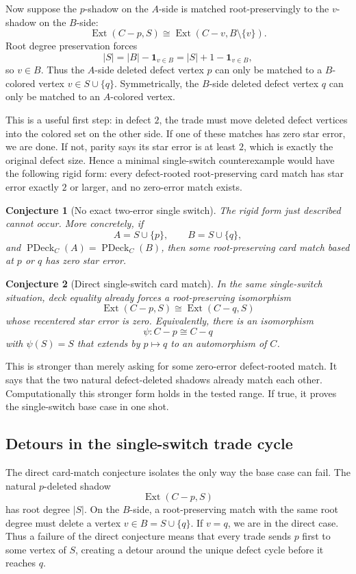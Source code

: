 \documentclass[11pt]{article}
\newtheorem{conjecture}{Conjecture}
\newcommand{\PDeck}{\operatorname{PDeck}}
\newcommand{\Ext}{\operatorname{Ext}}
\newcommand{\one}{\mathbf{1}}
\begin{document}
Now suppose the \(p\)-shadow on the \(A\)-side is matched root-preservingly to
the \(v\)-shadow on the \(B\)-side:
\[
  \Ext(C-p,S)
  \cong
  \Ext(C-v,B\setminus\{v\}).
\]
Root degree preservation forces
\[
  |S|=|B|-\one_{v\in B}=|S|+1-\one_{v\in B},
\]
so \(v\in B\).  Thus the \(A\)-side deleted defect vertex \(p\) can only be
matched to a \(B\)-colored vertex \(v\in S\cup\{q\}\).  Symmetrically, the
\(B\)-side deleted defect vertex \(q\) can only be matched to an
\(A\)-colored vertex.

This is a useful first step: in defect \(2\), the trade must move deleted
defect vertices into the colored set on the other side.  If one of these
matches has zero star error, we are done.  If not, parity says its star error
is at least \(2\), which is exactly the original defect size.  Hence a
minimal single-switch counterexample would have the following rigid form:
every defect-rooted root-preserving card match has star error exactly \(2\) or
larger, and no zero-error match exists.

\begin{conjecture}[No exact two-error single switch]
The rigid form just described cannot occur.  More concretely, if
\[
  A=S\cup\{p\},
  \qquad
  B=S\cup\{q\},
\]
and \(\PDeck_C(A)=\PDeck_C(B)\), then some root-preserving card match based at
\(p\) or \(q\) has zero star error.
\end{conjecture}

\begin{conjecture}[Direct single-switch card match]
In the same single-switch situation, deck equality already forces a
root-preserving isomorphism
\[
  \Ext(C-p,S)\cong \Ext(C-q,S)
\]
whose recentered star error is zero.  Equivalently, there is an isomorphism
\[
  \psi:C-p\cong C-q
\]
with \(\psi(S)=S\) that extends by \(p\mapsto q\) to an automorphism of \(C\).
\end{conjecture}

This is stronger than merely asking for some zero-error defect-rooted match.
It says that the two natural defect-deleted shadows already match each other.
Computationally this stronger form holds in the tested range.  If true, it
proves the single-switch base case in one shot.

\subsection{Detours in the single-switch trade cycle}

The direct card-match conjecture isolates the only way the base case can
fail.  The natural \(p\)-deleted shadow
\[
  \Ext(C-p,S)
\]
has root degree \(|S|\).  On the \(B\)-side, a root-preserving match with the
same root degree must delete a vertex \(v\in B=S\cup\{q\}\).  If \(v=q\), we
are in the direct case.  Thus a failure of the direct conjecture means that
every trade sends \(p\) first to some vertex of \(S\), creating a detour
around the unique defect cycle before it reaches \(q\).
\end{document}

